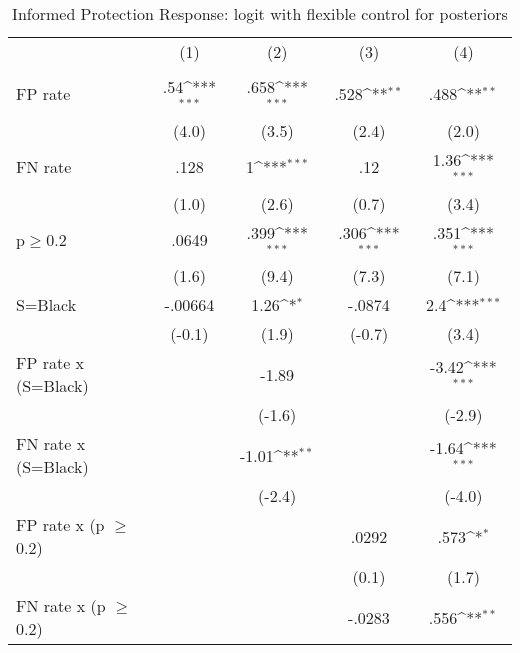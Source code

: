 \begin{table}[htbp]\centering
\def\sym#1{\ifmmode^{#1}\else\(^{#1}\)\fi}
\caption{Informed Protection Response: logit with flexible control for posteriors}
\begin{tabular}{l*{4}{c}}
\hline\hline
                &\multicolumn{1}{c}{(1)}&\multicolumn{1}{c}{(2)}&\multicolumn{1}{c}{(3)}&\multicolumn{1}{c}{(4)}\\
                &\multicolumn{1}{c}{}&\multicolumn{1}{c}{}&\multicolumn{1}{c}{}&\multicolumn{1}{c}{}\\
\hline
FP rate         &      .54\sym{***}&     .658\sym{***}&     .528\sym{**} &     .488\sym{**} \\
                &    (4.0)         &    (3.5)         &    (2.4)         &    (2.0)         \\
FN rate         &     .128         &        1\sym{***}&      .12         &     1.36\sym{***}\\
                &    (1.0)         &    (2.6)         &    (0.7)         &    (3.4)         \\
p$\geq$0.2      &    .0649         &     .399\sym{***}&     .306\sym{***}&     .351\sym{***}\\
                &    (1.6)         &    (9.4)         &    (7.3)         &    (7.1)         \\
S=Black         &  -.00664         &     1.26\sym{*}  &   -.0874         &      2.4\sym{***}\\
                &   (-0.1)         &    (1.9)         &   (-0.7)         &    (3.4)         \\
FP rate x (S=Black)&                  &    -1.89         &                  &    -3.42\sym{***}\\
                &                  &   (-1.6)         &                  &   (-2.9)         \\
FN rate x (S=Black)&                  &    -1.01\sym{**} &                  &    -1.64\sym{***}\\
                &                  &   (-2.4)         &                  &   (-4.0)         \\
FP rate x (p $\geq$ 0.2)&                  &                  &    .0292         &     .573\sym{*}  \\
                &                  &                  &    (0.1)         &    (1.7)         \\
FN rate x (p $\geq$ 0.2)&                  &                  &   -.0283         &     .556\sym{**} \\

\end{tabular}
\end{table}
